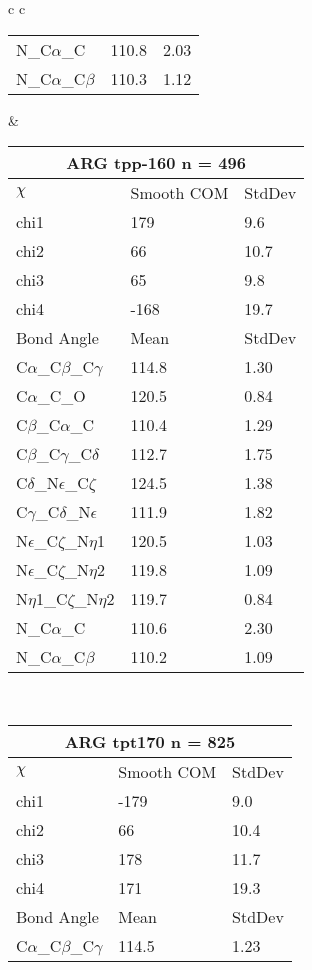 \begin{longtable}{ c c }
\begin{tabular}{ l l l }
  N\_C$\alpha$\_C & 110.8 & 2.03\\
  N\_C$\alpha$\_C$\beta$ & 110.3 & 1.12\\
  \bottomrule
  \end{tabular}
  &
  \begin{tabular}{ l l l }
  \toprule
  \multicolumn{3}{c}{ARG \textbf{tpp-160} n = 496} \\ \toprule
  $\chi$       & Smooth COM & StdDev \\ \midrule
  chi1 & 179 & 9.6 \\ 
  chi2 & 66 & 10.7 \\ 
  chi3 & 65 & 9.8 \\ 
  chi4 & -168 & 19.7 \\ \midrule
  Bond Angle   & Mean     & StdDev \\ \midrule
  C$\alpha$\_C$\beta$\_C$\gamma$ & 114.8 & 1.30\\
  C$\alpha$\_C\_O & 120.5 & 0.84\\
  C$\beta$\_C$\alpha$\_C & 110.4 & 1.29\\
  C$\beta$\_C$\gamma$\_C$\delta$ & 112.7 & 1.75\\
  C$\delta$\_N$\epsilon$\_C$\zeta$ & 124.5 & 1.38\\
  C$\gamma$\_C$\delta$\_N$\epsilon$ & 111.9 & 1.82\\
  N$\epsilon$\_C$\zeta$\_N$\eta$1 & 120.5 & 1.03\\
  N$\epsilon$\_C$\zeta$\_N$\eta$2 & 119.8 & 1.09\\
  N$\eta$1\_C$\zeta$\_N$\eta$2 & 119.7 & 0.84\\
  N\_C$\alpha$\_C & 110.6 & 2.30\\
  N\_C$\alpha$\_C$\beta$ & 110.2 & 1.09\\
  \bottomrule
  \end{tabular}
  \\
  \begin{tabular}{ l l l }
  \toprule
  \multicolumn{3}{c}{ARG \textbf{tpt170} n = 825} \\ \toprule
  $\chi$       & Smooth COM & StdDev \\ \midrule
  chi1 & -179 & 9.0 \\ 
  chi2 & 66 & 10.4 \\ 
  chi3 & 178 & 11.7 \\ 
  chi4 & 171 & 19.3 \\ \midrule
  Bond Angle   & Mean     & StdDev \\ \midrule
  C$\alpha$\_C$\beta$\_C$\gamma$ & 114.5 & 1.23\\

\end{tabular}
\end{longtable}
